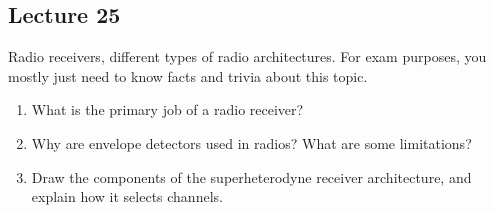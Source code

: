 \subsection*{Lecture 25}

Radio receivers, different types of radio architectures.
For exam purposes, you mostly just need to know facts and trivia
about this topic.

\begin{enumerate}
  \item What is the primary job of a radio receiver?
  \item Why are envelope detectors used in radios? What are some limitations?
  \item Draw the components of the superheterodyne receiver architecture, and explain how it selects channels.
\end{enumerate}